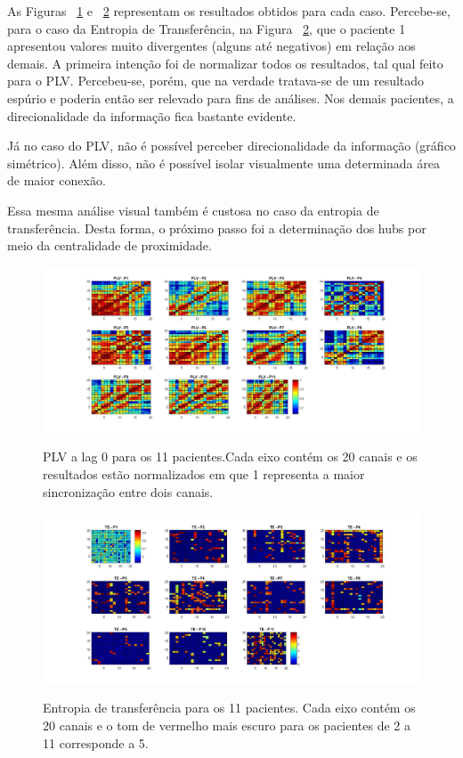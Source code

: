 \documentclass[
	12pt,				%
	openright,			%
	twoside,			%
	a4paper,			%
	english,			%
	french,				%
	spanish,			%
	brazil				%
	]{abntex2}
\begin{document}
As Figuras ~\ref{PLV_11pcts} e ~\ref{TE_11pctes} representam os resultados obtidos para cada caso. Percebe-se, para o caso da Entropia de Transferência, na Figura ~\ref{TE_11pctes}, que o paciente 1 apresentou valores muito divergentes (alguns até negativos) em relação aos demais.
A primeira intenção foi de normalizar todos os resultados, tal qual feito para o PLV. Percebeu-se, porém, que na verdade tratava-se de um resultado espúrio e poderia então ser relevado para fins de análises.
Nos demais pacientes, a direcionalidade da informação fica bastante evidente.

Já no caso do PLV, não é possível perceber direcionalidade da informação (gráfico simétrico). Além disso, não é possível isolar visualmente uma determinada área de maior conexão.

Essa mesma análise visual também é custosa no caso da entropia de transferência. Desta forma, o próximo passo foi a determinação dos hubs por meio da centralidade de proximidade.

\begin{figure}

\includegraphics[width=26cm]{figs/plv_todospcts.jpg}
\label{PLV_11pcts}
\caption{PLV a lag 0 para os 11 pacientes.Cada eixo contém os 20 canais e os resultados estão normalizados em que 1 representa a maior sincronização entre dois canais.}
\end{figure}

\begin{figure}
\includegraphics[width=25cm]{figs/Figure_TE_11pctes.jpg}
\label{TE_11pctes}
\caption{Entropia de transferência para os 11 pacientes. Cada eixo contém os 20 canais e o tom de vermelho mais escuro para os pacientes de 2 a 11 corresponde a 5.}
\end{figure}
\end{document}
